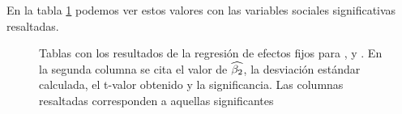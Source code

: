 En la tabla \ref{regresion_efectos_fijos_tabla} podemos ver estos valores con las variables sociales significativas resaltadas.


\begin{figure}

\caption{Tablas con los resultados de la regresión de efectos fijos para \ENGMAX, \FOMEAN y \NOISETOHARMONICS. En la segunda columna se cita el valor de $\widehat{\beta_2}$, la desviación estándar calculada, el t-valor obtenido y la significancia. Las columnas resaltadas corresponden a aquellas significantes}\label{regresion_efectos_fijos_tabla}
\end{figure}
